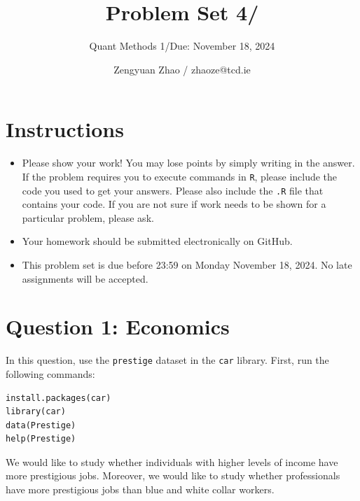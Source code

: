 \documentclass[12pt,letterpaper]{article}
\title{Problem Set 4/}
\date{Zengyuan Zhao / zhaoze@tcd.ie}
\author{Quant Methods 1/Due: November 18, 2024}
\begin{document}
	\maketitle
	\section*{Instructions}
	\begin{itemize}
		\item Please show your work! You may lose points by simply writing in the answer. If the problem requires you to execute commands in \texttt{R}, please include the code you used to get your answers. Please also include the \texttt{.R} file that contains your code. If you are not sure if work needs to be shown for a particular problem, please ask.
		\item Your homework should be submitted electronically on GitHub.
		\item This problem set is due before 23:59 on Monday November 18, 2024. No late assignments will be accepted.
	\end{itemize}



	\vspace{.5cm}
\section*{Question 1: Economics}
\vspace{.25cm}
\noindent 	
In this question, use the \texttt{prestige} dataset in the \texttt{car} library. First, run the following commands:

\begin{verbatim}
install.packages(car)
library(car)
data(Prestige)
help(Prestige)
\end{verbatim} 


\noindent We would like to study whether individuals with higher levels of income have more prestigious jobs. Moreover, we would like to study whether professionals have more prestigious jobs than blue and white collar workers.
\end{document}
